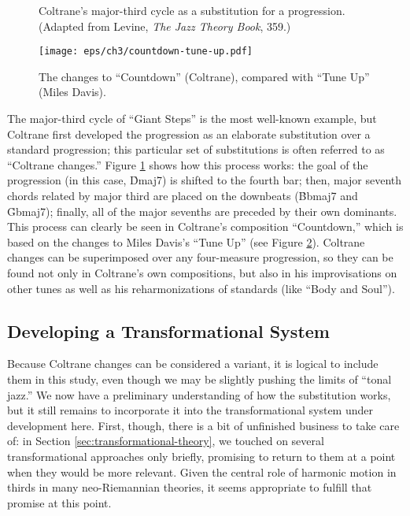 \begin{figure}[tbp]
  \caption[Coltrane's major-third cycle as a substitution for a \tfo
    progression.]{Coltrane's major-third cycle as a substitution for a \tfo
    progression. (Adapted from Levine, \emph{The Jazz Theory Book}, 359.)}
  \label{maj3:coltrane-substitution}
\end{figure}

\begin{figure}[tbp]
  \hspace{1em}\texttt{[image: eps/ch3/countdown-tune-up.pdf]}
  \caption{The changes to ``Countdown'' (Coltrane), compared with
    ``Tune Up'' (Miles Davis).}
  \label{maj3:countdown-tune-up}
\end{figure}

The major-third cycle of ``Giant Steps'' is the most well-known example, but
Coltrane first developed the progression as an elaborate substitution over a
standard \tfo progression; this particular set of substitutions is often
referred to as ``Coltrane changes.'' Figure
\ref{maj3:coltrane-substitution} shows how this process works: the goal of the
progression (in this case, \h{Dmaj7}) is shifted to the fourth bar; then, major
seventh chords related by major third are placed on the downbeats (\h{Bbmaj7}
and \h{Gbmaj7}); finally, all of the major sevenths are preceded by their own
dominants.\nocite{levine:1995} This process can clearly be seen in Coltrane's
composition ``Countdown,'' which is based on the changes to Miles Davis's
``Tune Up'' (see Figure \ref{maj3:countdown-tune-up}).
Coltrane changes can be superimposed over any four-measure \tfo progression,
so they can be found not only in Coltrane's own compositions, but also in his
improvisations on other tunes as well as his reharmonizations of standards
(like ``Body and Soul'').

\subsection{Developing a Transformational System}
\label{subsec:maj3-transformations}

Because Coltrane changes can be considered a \tf variant, it is logical to
include them in this study, even though we may be slightly pushing the limits
of ``tonal jazz.'' We now have a preliminary understanding of how the substitution
works, but it still remains to incorporate it into the transformational system
under development here. First, though, there is a bit of unfinished business
to take care of: in Section \ref{sec:transformational-theory}, we touched on
several transformational approaches only briefly, promising to return to them
at a point when they would be more relevant. Given the central role of
harmonic motion in thirds in many neo-Riemannian theories, it seems
appropriate to fulfill that promise at this point.

